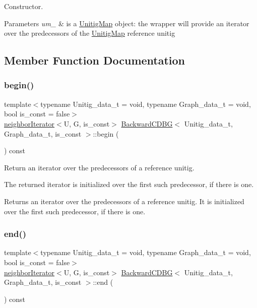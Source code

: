 Constructor. 


\begin{DoxyParams}{Parameters}
{\em um\+\_\+} & is a \hyperlink{classUnitigMap}{Unitig\+Map} object\+: the wrapper will provide an iterator over the predecessors of the \hyperlink{classUnitigMap}{Unitig\+Map} reference unitig \\
\hline
\end{DoxyParams}


\subsection{Member Function Documentation}
\mbox{\label{classBackwardCDBG_a134d64079a7acdcad727637647691897}} 
\subsubsection{\texorpdfstring{begin()}{begin()}}
{\footnotesize\ttfamily template$<$typename Unitig\+\_\+data\+\_\+t  = void, typename Graph\+\_\+data\+\_\+t  = void, bool is\+\_\+const = false$>$ \\
\hyperlink{classneighborIterator}{neighbor\+Iterator}$<$U, G, is\+\_\+const$>$ \hyperlink{classBackwardCDBG}{Backward\+C\+D\+BG}$<$ Unitig\+\_\+data\+\_\+t, Graph\+\_\+data\+\_\+t, is\+\_\+const $>$\+::begin (\begin{DoxyParamCaption}{ }\end{DoxyParamCaption}) const}



Return an iterator over the predecessors of a reference unitig. 

The returned iterator is initialized over the first such predecessor, if there is one. \begin{DoxyReturn}{Returns}
an iterator over the predecessors of a reference unitig. It is initialized over the first such predecessor, if there is one. 
\end{DoxyReturn}
\mbox{\label{classBackwardCDBG_a7b8f84da503325c3e3e2b5b024ed6997}} 
\subsubsection{\texorpdfstring{end()}{end()}}
{\footnotesize\ttfamily template$<$typename Unitig\+\_\+data\+\_\+t  = void, typename Graph\+\_\+data\+\_\+t  = void, bool is\+\_\+const = false$>$ \\
\hyperlink{classneighborIterator}{neighbor\+Iterator}$<$U, G, is\+\_\+const$>$ \hyperlink{classBackwardCDBG}{Backward\+C\+D\+BG}$<$ Unitig\+\_\+data\+\_\+t, Graph\+\_\+data\+\_\+t, is\+\_\+const $>$\+::end (\begin{DoxyParamCaption}{ }\end{DoxyParamCaption}) const}



